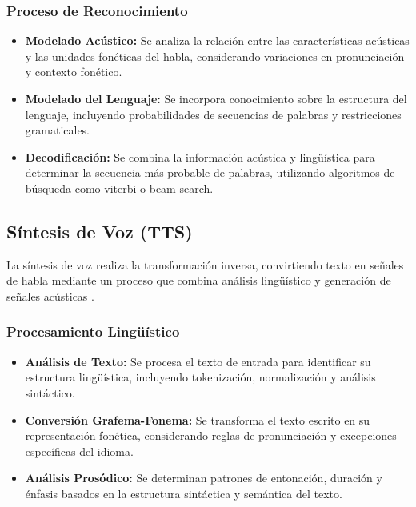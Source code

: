 \subsubsection{Proceso de Reconocimiento}

\begin{itemize}
  \item \textbf{Modelado Acústico:} Se analiza la relación entre las características acústicas y las unidades fonéticas del habla, considerando variaciones en pronunciación y contexto fonético.

  \item \textbf{Modelado del Lenguaje:} Se incorpora conocimiento sobre la estructura del lenguaje, incluyendo probabilidades de secuencias de palabras y restricciones gramaticales.

  \item \textbf{Decodificación:} Se combina la información acústica y lingüística para determinar la secuencia más probable de palabras, utilizando algoritmos de búsqueda como \gls{viterbi} o \gls{beam-search}.
\end{itemize}

\subsection{Síntesis de Voz (TTS)}

La síntesis de voz realiza la transformación inversa, convirtiendo texto en señales de habla mediante un proceso que combina análisis lingüístico y generación de señales acústicas \cite{taylor2009text}.


\subsubsection{Procesamiento Lingüístico}

\begin{itemize}
  \item \textbf{Análisis de Texto:} Se procesa el texto de entrada para identificar su estructura lingüística, incluyendo tokenización, normalización y análisis sintáctico.

  \item \textbf{Conversión Grafema-Fonema:} Se transforma el texto escrito en su representación fonética, considerando reglas de pronunciación y excepciones específicas del idioma.

  \item \textbf{Análisis Prosódico:} Se determinan patrones de entonación, duración y énfasis basados en la estructura sintáctica y semántica del texto.
\end{itemize}

